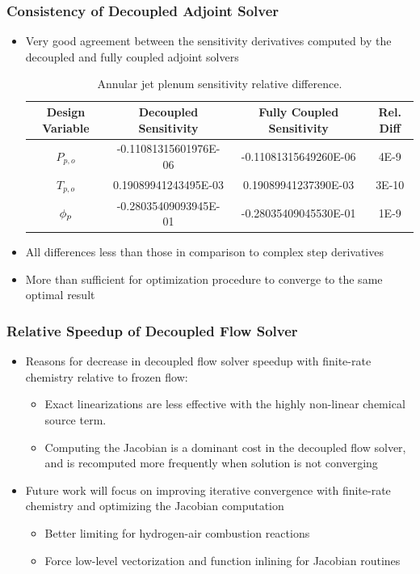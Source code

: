 \documentclass{beamer}
\begin{document}
\begin{frame}
  \frametitle{Consistency of Decoupled Adjoint Solver}
  \begin{itemize}
    \item Very good agreement between the sensitivity derivatives computed by
      the decoupled and fully coupled adjoint solvers
\begin{table}[h]
  \tiny
  \centering
  \begin{tabular}{c|c|c|c}
    Design Variable & Decoupled Sensitivity & Fully Coupled Sensitivity & Rel. Diff\\
    \hline
    $P_{p,o}$ & -0.11081315601976E-06 & -0.11081315649260E-06 & 4E-9  \\
    $T_{p,o}$ &  0.19089941243495E-03 &  0.19089941237390E-03 & 3E-10 \\
    $\phi_p$     & -0.28035409093945E-01 & -0.28035409045530E-01 & 1E-9
  \end{tabular}
  \caption{Annular jet plenum sensitivity relative difference.}
\end{table}
    \item All differences less than those in comparison to complex step derivatives
    \item More than sufficient for optimization procedure to converge to the
      same optimal result
  \end{itemize}
\end{frame}

\begin{frame}
  \frametitle{Relative Speedup of Decoupled Flow Solver}
  \begin{itemize}
    \item Reasons for decrease in decoupled flow solver speedup with finite-rate
      chemistry relative to frozen flow:
    \begin{itemize}
      \item Exact linearizations are less effective with the highly non-linear
        chemical source term.
      \item Computing the Jacobian is a dominant cost in the decoupled flow
        solver, and is recomputed more frequently when solution is not
        converging
    \end{itemize}
  \item Future work will focus on improving iterative convergence with
    finite-rate chemistry and optimizing the Jacobian computation 
    \begin{itemize}
      \item Better limiting for hydrogen-air combustion reactions
      \item Force low-level vectorization and function inlining for Jacobian
        routines
    \end{itemize}
  \end{itemize}
\end{frame}
\end{document}
